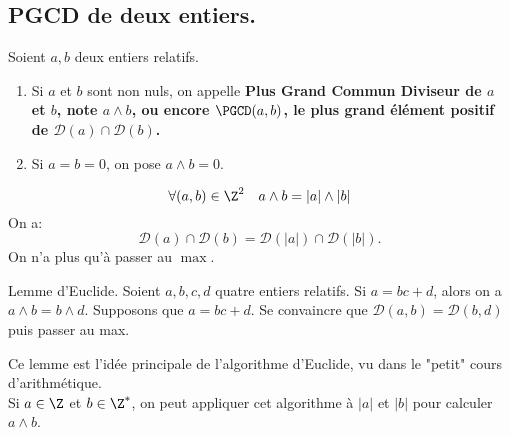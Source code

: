 \documentclass[11pt]{article}
\renewcommand*{\D}{\mathcal{D}}
\begin{document}
\subsection{PGCD de deux entiers.}

\begin{defi}{}{}
    Soient $a,b$ deux entiers relatifs.
    \begin{enumerate}[topsep=0pt,itemsep=-0.9 ex]
        \item Si $a$ et $b$ sont non nuls, on appelle \bf{Plus Grand Commun Diviseur} de $a$ et $b$, note $a\land b$, ou encore $\PGCD(a,b)$, le plus grand élément positif de $\D(a)\cap\D(b)$.
        \item Si $a=b=0$, on pose $a\land b=0$.
    \end{enumerate}
\end{defi}

\begin{prop}{}{}
    \begin{equation*}
        \forall (a,b)\in\Z^2\quad a\land b = |a|\land|b|
    \end{equation*}
    \tcblower
    On a:
    \begin{equation*}
        \D(a)\cap\D(b)=\D(|a|)\cap\D(|b|).
    \end{equation*}
    On n'a plus qu'à passer au $\max$.
\end{prop}

\begin{prop}{Lemme d'Euclide.}{}
    Soient $a,b,c,d$ quatre entiers relatifs. Si $a=bc+d$, alors on a $a\land b=b\land d$.
    \tcblower
    Supposons que $a=bc+d$. Se convaincre que $\D(a,b)=\D(b,d)$ puis passer au max.
\end{prop}

\begin{meth}{}{}
    Ce lemme est l'idée principale de l'algorithme d'Euclide, vu dans le "petit" cours d'arithmétique.\\
    Si $a\in\Z$ et $b\in\Z^*$, on peut appliquer cet algorithme à $|a|$ et $|b|$ pour calculer $a\land b$.
\end{meth}
\end{document}
